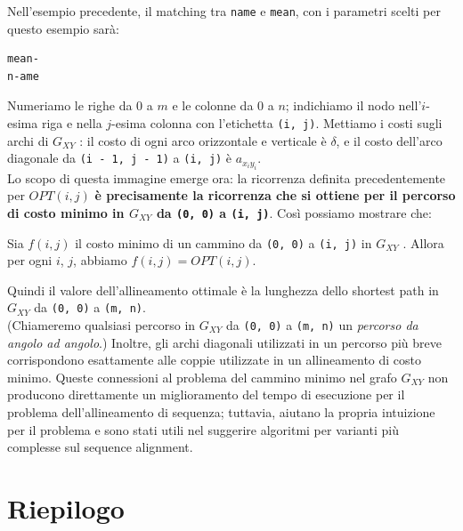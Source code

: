 Nell'esempio precedente, il matching tra \texttt{name} e \texttt{mean}, con i
parametri scelti per questo esempio sarà:

\begin{verbatim}
mean-
n-ame
\end{verbatim}

Numeriamo le righe da 0 a $m$ e le colonne da 0 a $n$; indichiamo il
nodo nell'$i$-esima riga e nella $j$-esima colonna con l'etichetta
\texttt{(i,\ j)}. Mettiamo i costi sugli archi di $G_{XY}$ : il costo
di ogni arco orizzontale e verticale è $\delta$, e il costo dell'arco
diagonale da \texttt{(i\ -\ 1,\ j\ -\ 1)} a \texttt{(i,\ j)} è
$a_{x_i y_i}$.\\ Lo scopo di questa immagine emerge ora: la ricorrenza
definita precedentemente per $OPT(i, j)$ \textbf{è precisamente la
  ricorrenza che si ottiene per il percorso di costo minimo in $G_{XY}$
  da \texttt{(0,\ 0)} a \texttt{(i,\ j)}}. Così possiamo mostrare che:
\begin{myblockquote}
  Sia $f(i, j)$ il costo minimo di un cammino da
  \texttt{(0,\ 0)} a \texttt{(i,\ j)} in $G_{XY}$ . Allora per ogni
  $i$, $j$, abbiamo $f(i, j) = OPT(i, j)$.
\end{myblockquote}

Quindi il valore dell'allineamento ottimale è la lunghezza dello
shortest path in $G_{XY}$ da \texttt{(0,\ 0)} a \texttt{(m,\ n)}.\\
(Chiameremo qualsiasi percorso in $G_{XY}$ da \texttt{(0,\ 0)} a
\texttt{(m,\ n)} un \emph{percorso da angolo ad angolo}.) Inoltre, gli
archi diagonali utilizzati in un percorso più breve corrispondono
esattamente alle coppie utilizzate in un allineamento di costo minimo.
Queste connessioni al problema del cammino minimo nel grafo $G_{XY}$
non producono direttamente un miglioramento del tempo di esecuzione per
il problema dell'allineamento di sequenza; tuttavia, aiutano la propria
intuizione per il problema e sono stati utili nel suggerire algoritmi
per varianti più complesse sul sequence alignment.

\section{Riepilogo}

